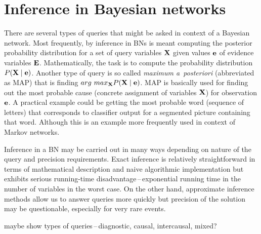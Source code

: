 \documentclass[english,cover]{fitthesis} %
\newcommand{\term}[1]{\emph{#1}}           %
\newcommand{\vars}[1]{{\bold{#1}}}         %
\newcommand{\todo}[1]{{\color{red}#1}}
\begin{document}
\section{Inference in Bayesian networks}
There are several types of queries that might be asked in context of a Bayesian network. Most frequently, by inference in BNs is meant computing the posterior probability distribution for a set of query variables $\vars{X}$ given values $\vars{e}$ of evidence variables $\vars{E}$. Mathematically, the task is to compute the probability distribution $P(\vars{X} \mid \vars{e})$. Another type of query is so called \term{maximum a~posteriori} (abbreviated as MAP) that is finding $arg\ max_\vars{X} P(\vars{X} \mid \vars{e})$. MAP is basically used for finding out the most probable cause (concrete assignment of variables $\vars{X}$) for observation $\vars{e}$. A practical example could be getting the most probable word (sequence of letters) that corresponds to classifier output for a segmented picture containing that word. Although this is an example more frequently used in context of Markov networks.

Inference in a BN may be carried out in many ways depending on nature of the query and precision requirements. Exact inference is relatively straightforward in terms of mathematical description and naive algorithmic implementation but exhibits serious running-time disadvantage\,--\,exponential running time in the number of variables in the worst case. On the other hand, approximate inference methods allow us to answer queries more quickly but precision of the solution may be questionable, especially for very rare events.

\todo{maybe show types of queries\,--\,diagnostic, causal, intercausal, mixed?~\cite[p.~448]{russell_norvig_ed2}}
\end{document}
